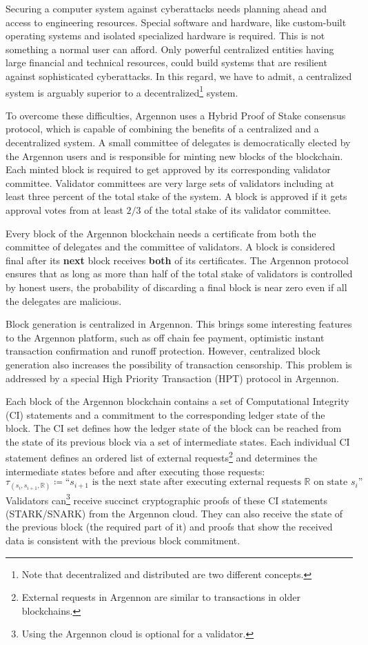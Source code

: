 Securing a computer system against cyberattacks needs planning ahead and access to engineering resources.
Special software and hardware, like custom-built operating systems and isolated specialized hardware is required.
This is not something a normal user can afford. Only powerful centralized entities having large financial and
technical resources, could build
systems that are resilient against sophisticated cyberattacks. In this regard, we have to admit, a centralized system is
arguably superior to a decentralized\footnote{Note that decentralized and distributed are two different concepts.}
system.

To overcome these difficulties, Argennon uses a Hybrid Proof of Stake consensus protocol, which is
capable of combining the benefits of a centralized and a decentralized system. A small committee of
delegates is democratically elected
by the Argennon users and is responsible for minting new blocks of the blockchain. Each
minted block is required to get approved by its corresponding validator committee. Validator committees are very
large sets of validators including at least three percent of the total stake of the system. A block is approved if it
gets approval votes from at least \(2/3\) of the total stake of its validator committee.

Every block of the Argennon blockchain needs a certificate from both the committee of delegates and
the committee of validators. A block is considered final after its \textbf{next} block receives \textbf{both} of
its certificates. The Argennon protocol ensures that as long as more than half of the total stake of validators is
controlled by honest users, the probability of discarding a final block is near zero even if all the delegates are
malicious.

Block generation is centralized in Argennon. This brings some interesting features to the Argennon platform, such as off
chain fee payment, optimistic instant transaction confirmation and runoff protection. However, centralized
block generation also increases the possibility of transaction censorship. This problem is addressed by a special
High Priority Transaction (HPT) protocol in Argennon.

Each block of the Argennon blockchain contains a set of Computational Integrity (CI) statements and a commitment to
the corresponding ledger state of the block. The CI set defines how
the ledger state of the block can be reached from the state of its previous block via a set of intermediate states.
Each individual CI statement defines an ordered list of external requests\footnote{External requests in Argennon are
similar to transactions in older blockchains.} and determines the intermediate states before and after executing those
requests:
\[
    \tau_{(s_i,s_{i+1},\mathbb{R})} \coloneqq \text{``$s_{i+1}$ is the next state after executing external requests
        $\mathbb{R}$ on state $s_i$''}
\]
Validators can\footnote{Using the Argennon cloud is optional for a validator.} receive succinct cryptographic proofs
of these CI statements (STARK/SNARK) from the Argennon cloud. They can also receive the state of the previous
block (the required part of it) and proofs that show the received data is consistent with the previous block commitment.

